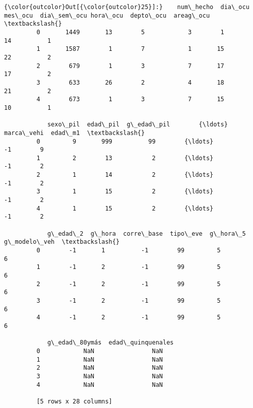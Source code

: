 \documentclass[11pt]{article}
\begin{document}
\begin{Verbatim}[commandchars=\\\{\}]
{\color{outcolor}Out[{\color{outcolor}25}]:}    num\_hecho  dia\_ocu  mes\_ocu  dia\_sem\_ocu hora\_ocu  depto\_ocu  areag\_ocu  \textbackslash{}
         0       1449       13        5            3        1         14          1   
         1       1587        1        7            1       15         22          2   
         2        679        1        3            7       17         17          2   
         3        633       26        2            4       18         21          2   
         4        673        1        3            7       15         10          1   
         
            sexo\_pil  edad\_pil  g\_edad\_pil        {\ldots}          marca\_vehi  edad\_m1  \textbackslash{}
         0         9       999          99        {\ldots}                  -1        9   
         1         2        13           2        {\ldots}                  -1        2   
         2         1        14           2        {\ldots}                  -1        2   
         3         1        15           2        {\ldots}                  -1        2   
         4         1        15           2        {\ldots}                  -1        2   
         
            g\_edad\_2  g\_hora  corre\_base  tipo\_eve  g\_hora\_5 g\_modelo\_veh  \textbackslash{}
         0        -1       1          -1        99         5            6   
         1        -1       2          -1        99         5            6   
         2        -1       2          -1        99         5            6   
         3        -1       2          -1        99         5            6   
         4        -1       2          -1        99         5            6   
         
            g\_edad\_80ymás  edad\_quinquenales  
         0            NaN                NaN  
         1            NaN                NaN  
         2            NaN                NaN  
         3            NaN                NaN  
         4            NaN                NaN  
         
         [5 rows x 28 columns]
\end{Verbatim}
            
\end{document}
